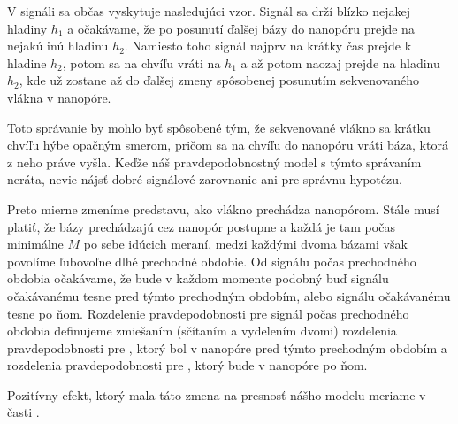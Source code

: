 V signáli sa občas vyskytuje nasledujúci vzor. Signál sa drží blízko nejakej hladiny $h_1$ a očakávame, 
že po posunutí ďalšej bázy do nanopóru prejde na nejakú inú hladinu $h_2$. Namiesto toho signál 
najprv na krátky čas prejde k hladine $h_2$, potom sa na chvíľu vráti na $h_1$ a až potom naozaj prejde
na hladinu $h_2$, kde už zostane až do ďalšej zmeny spôsobenej posunutím sekvenovaného vlákna v nanopóre.


Toto správanie by mohlo byť spôsobené tým, že sekvenované vlákno sa krátku chvíľu hýbe opačným smerom,
pričom sa na chvíľu do nanopóru vráti báza, ktorá z neho práve vyšla. Keďže náš pravdepodobnostný
model s týmto správaním neráta, nevie nájsť dobré signálové zarovnanie ani pre správnu hypotézu.

Preto mierne zmeníme predstavu, ako vlákno prechádza nanopórom. Stále musí platiť, že bázy prechádzajú 
cez
nanopór postupne a každá je tam počas minimálne $M$ po sebe idúcich meraní, medzi každými dvoma
bázami však povolíme ľubovoľne dlhé prechodné obdobie. Od signálu počas prechodného obdobia očakávame, 
že bude v každom momente podobný buď signálu očakávanému tesne pred týmto prechodným obdobím, alebo 
signálu očakávanému tesne po ňom. Rozdelenie pravdepodobnosti pre signál počas prechodného obdobia
definujeme zmiešaním (sčítaním a vydelením dvomi) rozdelenia pravdepodobnosti pre \kmer{}, ktorý bol 
v nanopóre pred týmto prechodným obdobím a rozdelenia pravdepodobnosti pre \kmer{}, ktorý
bude v nanopóre po ňom.

Pozitívny efekt, ktorý mala táto zmena na presnosť nášho modelu meriame v časti .